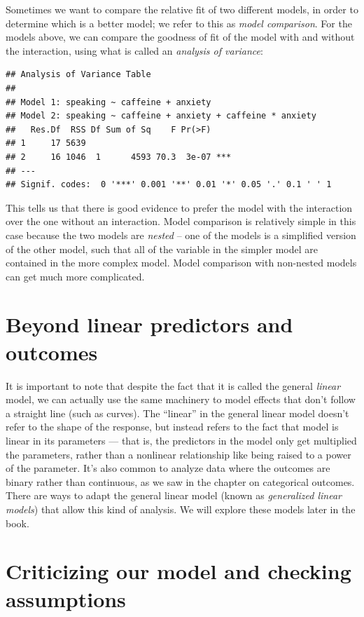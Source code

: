 \documentclass[12pt,]{book}
\theoremstyle{definition}
\theoremstyle{definition}
\theoremstyle{definition}
\theoremstyle{remark}
\begin{document}
Sometimes we want to compare the relative fit of two different models, in order to determine which is a better model; we refer to this as \emph{model comparison}. For the models above, we can compare the goodness of fit of the model with and without the interaction, using what is called an \emph{analysis of variance}:

\begin{verbatim}
## Analysis of Variance Table
## 
## Model 1: speaking ~ caffeine + anxiety
## Model 2: speaking ~ caffeine + anxiety + caffeine * anxiety
##   Res.Df  RSS Df Sum of Sq    F Pr(>F)    
## 1     17 5639                             
## 2     16 1046  1      4593 70.3  3e-07 ***
## ---
## Signif. codes:  0 '***' 0.001 '**' 0.01 '*' 0.05 '.' 0.1 ' ' 1
\end{verbatim}

This tells us that there is good evidence to prefer the model with the interaction over the one without an interaction. Model comparison is relatively simple in this case because the two models are \emph{nested} -- one of the models is a simplified version of the other model, such that all of the variable in the simpler model are contained in the more complex model. Model comparison with non-nested models can get much more complicated.

\hypertarget{beyond-linear-predictors-and-outcomes}{%
\section{Beyond linear predictors and outcomes}\label{beyond-linear-predictors-and-outcomes}}

It is important to note that despite the fact that it is called the general \emph{linear} model, we can actually use the same machinery to model effects that don't follow a straight line (such as curves). The ``linear'' in the general linear model doesn't refer to the shape of the response, but instead refers to the fact that model is linear in its parameters --- that is, the predictors in the model only get multiplied the parameters, rather than a nonlinear relationship like being raised to a power of the parameter. It's also common to analyze data where the outcomes are binary rather than continuous, as we saw in the chapter on categorical outcomes. There are ways to adapt the general linear model (known as \emph{generalized linear models}) that allow this kind of analysis. We will explore these models later in the book.

\hypertarget{model-criticism}{%
\section{Criticizing our model and checking assumptions}\label{model-criticism}}
\end{document}
